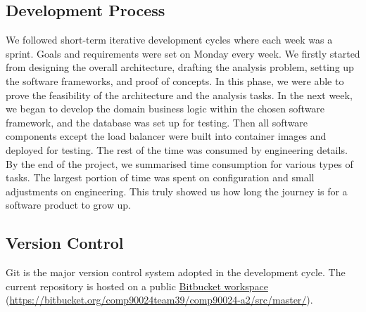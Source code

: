 \subsection{Development Process}

We followed short-term iterative development cycles where each week was a sprint. Goals and requirements were set on Monday every week. We firstly started from designing the overall architecture, drafting the analysis problem, setting up the software frameworks, and proof of concepts. In this phase, we were able to prove the feasibility of the architecture and the analysis tasks. In the next week, we began to develop the domain business logic within the chosen software framework, and the database was set up for testing. Then all software components except the load balancer were built into container images and deployed for testing. The rest of the time was consumed by engineering details. By the end of the project, we summarised time consumption for various types of tasks. The largest portion of time was spent on configuration and small adjustments on engineering. This truly showed us how long the journey is for a software product to grow up. 

\subsection{Version Control}

Git is the major version control system adopted in the development cycle. The current repository is hosted on a public \href{https://bitbucket.org/comp90024team39/comp90024-a2/src/master/}{Bitbucket workspace} (\url{https://bitbucket.org/comp90024team39/comp90024-a2/src/master/}). 